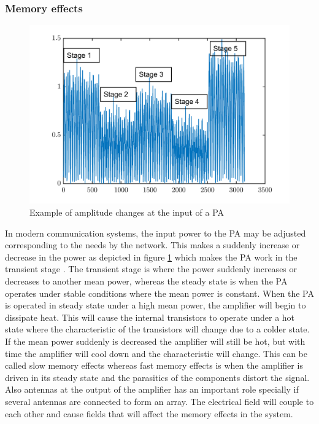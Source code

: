 \subsubsection{Memory effects}

\begin{figure}[H]
\centering 
\includegraphics[scale = 0.7]{figures/ch1/amplitude.png}
\caption{Example of amplitude changes at the input of a PA }
\label{fig:mem_amp}
\end{figure}


In modern communication systems, the input power to the PA may be adjusted corresponding to the needs by the network. This makes a suddenly increase or decrease in the power as depicted in figure \ref{fig:mem_amp} which makes the PA work in the transient stage \citep{liu2007}. The transient stage is where the power suddenly increases or decreases to another mean power, whereas the steady state is when the PA operates under stable conditions where the mean power is constant. When the PA is operated in steady state under a high mean power, the amplifier will begin to dissipate heat. This will cause the internal transistors to operate under a hot state where the characteristic of the transistors will change due to a colder state. If the mean power suddenly is decreased the amplifier will still be hot, but with time the amplifier will cool down and the characteristic will change. This can be called slow memory effects whereas fast memory effects is when the amplifier is driven in its steady state and the parasitics of the components distort the signal. Also antennas at the output of the amplifier has an important role specially if several antennas are connected to form an array. The electrical field will couple to each other and cause fields that will affect the memory effects in the system. 



